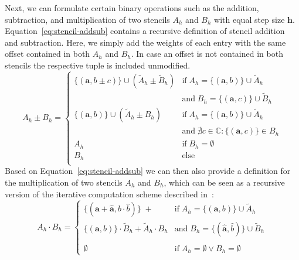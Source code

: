 Next, we can formulate certain binary operations such as the addition, subtraction, and multiplication of two stencils $A_h$ and $B_h$ with equal step size $\bm{h}$.
Equation~\eqref{eq:stencil-addsub} contains a recursive definition of stencil addition and subtraction.
Here, we simply add the weights of each entry with the same offset contained in both $A_h$ and $B_h$.
In case an offset is not contained in both stencils the respective tuple is included unmodified.  
\begin{equation}
	A_h \pm B_h = 
	\begin{cases}
		\{(\bm{a}, b\pm c ) \} \cup (\tilde{A}_h \pm \tilde{B}_h) & \text{if} \; A_h = 	\{(\bm{a}, b ) \} \cup \tilde{A}_h \\
		& \text{and} \; B_h = \{(\bm{a}, c ) \} \cup \tilde{B}_h \\
		
		\{(\bm{a}, b ) \} \cup (\tilde{A}_h \pm B_h) & \text{if} \; A_h = 	\{(\bm{a}, b ) \} \cup \tilde{A}_h \\
		& \text{and} \; \nexists  c \in \mathbb{C} : \{(\bm{a}, c ) \} \in B_h 
		\\
		A_h & \text{if} \; B_h = \emptyset
		\\
		B_h & \text{else} 
		\\
	\end{cases}
\label{eq:stencil-addsub}
\end{equation}
Based on Equation~\eqref{eq:stencil-addsub} we can then also provide a definition for the multiplication of two stencils $A_h$ and $B_h$, which can be seen as a recursive version of the iterative computation scheme described in~\cite{rittich2018extending}:
\begin{equation}
	A_h \cdot B_h = 
	\begin{cases}
		\{(\bm{a} + \bm{\hat{a}}, b \cdot \hat{b} ) \} \; + & \text{if} \; A_h = \{(\bm{a}, b ) \} \cup \tilde{A}_h \\
		\{(\bm{a}, b ) \} \cdot \tilde{B}_h + \tilde{A}_h \cdot B_h & 
		\text{and} \; B_h = \{(\bm{\hat{a}}, \hat{b} ) \} \cup \tilde{B}_h \\ & \\
		\emptyset & \text{if} \; A_h = \emptyset \vee B_h = \emptyset
	\end{cases}
\label{eq:stencil-mult}
\end{equation}
